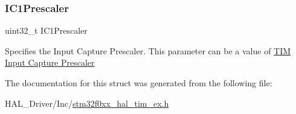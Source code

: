 \subsubsection{\texorpdfstring{I\+C1\+Prescaler}{IC1Prescaler}}
{\footnotesize\ttfamily uint32\+\_\+t I\+C1\+Prescaler}

Specifies the Input Capture Prescaler. This parameter can be a value of \hyperlink{group___t_i_m___input___capture___prescaler}{T\+IM Input Capture Prescaler} 

The documentation for this struct was generated from the following file\+:\begin{DoxyCompactItemize}
\item 
H\+A\+L\+\_\+\+Driver/\+Inc/\hyperlink{stm32f0xx__hal__tim__ex_8h}{stm32f0xx\+\_\+hal\+\_\+tim\+\_\+ex.\+h}\end{DoxyCompactItemize}
